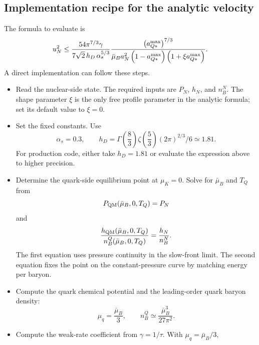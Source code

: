 \clearpage

\subsection{Implementation recipe for the analytic velocity}
\label{sec:analytic-velocity-recipe}

The formula to evaluate is
\begin{equation}
u_N^2
\le
\frac{
54\pi^{7/3}\gamma
}{
7\sqrt{2}\,h_D\,\alpha_s^{5/3}
}
\frac{
\left(a_{Q*}^{\rm max}\right)^{7/3}
}{
\bar\mu_B a_N^2
\left(1-a_{Q*}^{\rm max}\right)
\left(1+\xi a_{Q*}^{\rm max}\right)
}.
\end{equation}
A direct implementation can follow these steps.
\begin{itemize}
\item Read the nuclear-side state. The required inputs are \(P_N\), \(h_N\),
and \(n_B^N\). The shape parameter \(\xi\) is the only free profile parameter
in the analytic formula; set its default value to \(\xi=0\).
\item Set the fixed constants. Use
\begin{equation}
\alpha_s=0.3,
\qquad
h_D=
\Gamma\!\left(\frac{8}{3}\right)
\zeta\!\left(\frac{5}{3}\right)
(2\pi)^{2/3}/6
\simeq1.81.
\end{equation}
For production code, either take \(h_D=1.81\) or evaluate the expression above
to higher precision.
\item Determine the quark-side equilibrium point at \(\mu_K=0\). Solve for
\(\bar\mu_B\) and \(T_Q\) from
\begin{equation}
P_{\rm QM}(\bar\mu_B,0,T_Q)=P_N
\end{equation}
and
\begin{equation}
\frac{h_{\rm QM}(\bar\mu_B,0,T_Q)}
{n_B^Q(\bar\mu_B,0,T_Q)}
=
\frac{h_N}{n_B^N}.
\end{equation}
The first equation uses pressure continuity in the slow-front limit. The second
equation fixes the point on the constant-pressure curve by matching energy per
baryon.
\item Compute the quark chemical potential and the leading-order quark baryon
density:
\begin{equation}
\mu_q=\frac{\bar\mu_B}{3},
\qquad
n_B^Q\simeq\frac{\bar\mu_B^3}{27\pi^2}.
\end{equation}
\item Compute the weak-rate coefficient from \(\gamma=1/\tau\). With
\(\mu_q=\bar\mu_B/3\),
\begin{equation}

\end{equation}
\end{itemize}
